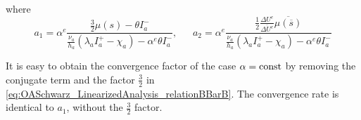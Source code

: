 where
\begin{equation}
    a_1 = \alpha^e\frac{\frac{3}{2}\mu(s) - \theta I_a^{-}}
	{\frac{\nu_a}{h_a}\left(\lambda_a I_a^{+} - \chi_a \right)
	- \alpha^e \theta I_a^{-}}, ~~~~~~~
        a_2 = \alpha^e\frac{\frac{1}{2}\frac{\Delta U^e}{\overline{\Delta U^e}}
 \overline{\mu(\overline{s})}}
	{\frac{\nu_a}{h_a}\left(\lambda_a I_a^{+} - \chi_a \right)
	- \alpha^e \theta I_a^{-}}
\end{equation}
\begin{remark}
	It is easy to obtain the convergence factor
	of the case $\alpha={\rm const}$ by removing the conjugate
	term and the factor $\frac{3}{2}$ in
	\eqref{eq:OASchwarz_LinearizedAnalysis_relationBBarB}.
	The convergence rate is identical to $a_1$,
	without the $\frac{3}{2}$ factor.
\end{remark}
